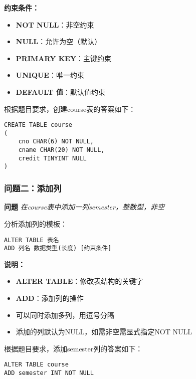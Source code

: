 \textbf{约束条件：}
\begin{itemize}
  \item \textbf{NOT NULL}：非空约束
  \item \textbf{NULL}：允许为空（默认）
  \item \textbf{PRIMARY KEY}：主键约束
  \item \textbf{UNIQUE}：唯一约束
  \item \textbf{DEFAULT 值}：默认值约束
\end{itemize}

\qquad 根据题目要求，创建course表的答案如下：

\begin{mdframed}[backgroundcolor=blue!5]
\begin{verbatim}
CREATE TABLE course
(
    cno CHAR(6) NOT NULL,
    cname CHAR(20) NOT NULL,
    credit TINYINT NULL
)
\end{verbatim}
\end{mdframed}

\subsubsection{问题二：添加列}

\textbf{问题} \emph{在course表中添加一列semester，整数型，非空}

\qquad 分析添加列的模板：

\begin{mdframed}[backgroundcolor=gray!10]
\begin{verbatim}
ALTER TABLE 表名
ADD 列名 数据类型(长度) [约束条件]
\end{verbatim}
\end{mdframed}

\textbf{说明：}
\begin{itemize}
  \item \textbf{ALTER TABLE}：修改表结构的关键字
  \item \textbf{ADD}：添加列的操作
  \item 可以同时添加多列，用逗号分隔
  \item 添加的列默认为NULL，如需非空需显式指定NOT NULL
\end{itemize}

\qquad 根据题目要求，添加semester列的答案如下：

\begin{mdframed}[backgroundcolor=blue!5]
\begin{verbatim}
ALTER TABLE course
ADD semester INT NOT NULL
\end{verbatim}
\end{mdframed}


